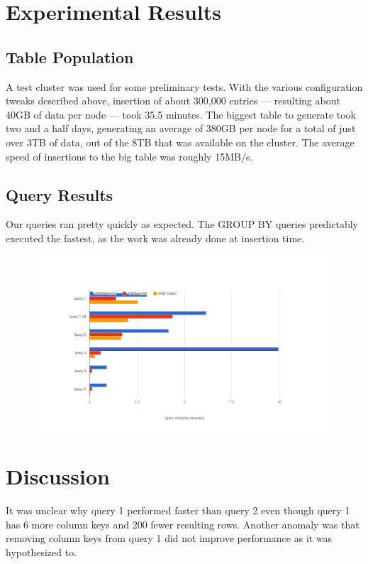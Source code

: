 \documentclass[letterpaper]{article}
\begin{document}
\section{Experimental Results}

\subsection{Table Population}

A test cluster was used for some preliminary tests. With the
various configuration tweaks described above, insertion of about 300,000
entries --- resulting about 40GB of data per node --- took 35.5 minutes.
The biggest table to generate took two and a half days, generating an average
of 380GB per node for a total of just over 3TB of data, out of the 8TB that was
available on the cluster. The average speed of insertions to the big table was
roughly 15MB/s. 

\subsection{Query Results}

Our queries ran pretty quickly as expected. The GROUP BY queries predictably executed the
fastest, as the work was already done at insertion time.
\begin{figure}[h]
	\centering
	\includegraphics[resolution=300]{chart}
	\label{fig:Query Execution Times}
\end{figure}

\section{Discussion}

It was unclear why query 1 performed faster than query 2 even though query 1
has 6 more column keys and 200 fewer resulting rows. Another anomaly was that
removing column keys from query 1 did not improve performance as it was
hypothesized to.
\end{document}
